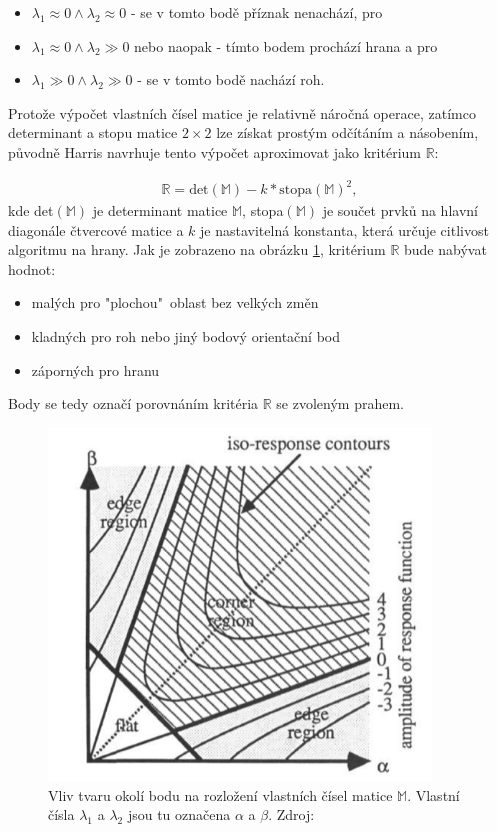 \begin{itemize}
	\item ${\lambda_1 \approx 0 \wedge \lambda_2 \approx 0}$ - se v tomto bodě příznak nenachází, pro
	\item ${\lambda_1 \approx 0 \wedge \lambda_2 \gg 0}$ nebo naopak - tímto bodem prochází hrana a pro
	\item ${\lambda_1 \gg 0 \wedge \lambda_2 \gg 0}$  - se v tomto bodě nachází roh.
\end{itemize}

Protože výpočet vlastních čísel matice je relativně náročná operace, zatímco determinant a stopu matice $2\times2$ lze získat prostým odčítáním a násobením, původně Harris navrhuje tento výpočet aproximovat jako kritérium $\mathbb{R}$:

\begin{align}
\mathbb{R} = \text{det}(\mathbb{M}) - k * \text{stopa}(\mathbb{M})^2,
\end{align}
kde det$(\mathbb{M})$ je determinant matice $\mathbb{M}$, stopa$(\mathbb{M})$ je součet prvků na hlavní diagonále čtvercové matice a $k$ je nastavitelná konstanta, která určuje citlivost algoritmu na hrany. Jak je zobrazeno na obrázku \ref{Harris_eigen}, kritérium $\mathbb{R}$ bude nabývat hodnot:
\begin{itemize}
	\item malých pro "plochou"\ oblast bez velkých změn
	\item kladných pro roh nebo jiný bodový orientační bod
	\item záporných pro hranu
\end{itemize} 

Body se tedy označí porovnáním kritéria $\mathbb{R}$ se zvoleným prahem.

\begin{figure}[!ht] 
	\centering
	\includegraphics[width=4in]{img/Harris_eigen.png}
	\caption{Vliv tvaru okolí bodu na rozložení vlastních čísel matice $\mathbb{M}$. Vlastní čísla $\lambda_1$ a $\lambda_2$ jsou tu označena $\alpha$ a $\beta$. Zdroj: \cite{harris1988combined}}
	\label{Harris_eigen}
\end{figure}


